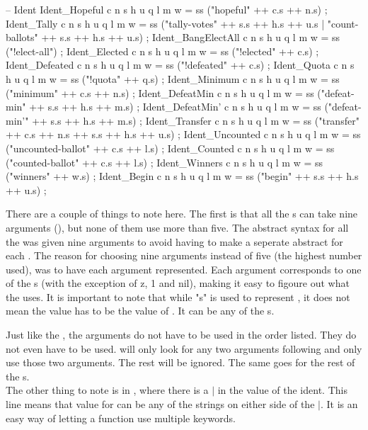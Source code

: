 \begin{lstgf}
        -- Ident
        Ident_Hopeful c n s h u q l m w
            = ss ("hopeful" ++ c.s ++ n.s) ;
        Ident_Tally c n s h u q l m w
            = ss ("tally-votes" ++ s.s ++ h.s ++ u.s | "count-ballots" ++ s.s ++ h.s ++ u.s) ;
        Ident_BangElectAll c n s h u q l m w
            = ss ("!elect-all") ;
        Ident_Elected c n s h u q l m w
            = ss ("!elected" ++ c.s) ;
        Ident_Defeated c n s h u q l m w
            = ss ("!defeated" ++ c.s) ;
        Ident_Quota c n s h u q l m w
            = ss ("!quota" ++ q.s) ;
        Ident_Minimum c n s h u q l m w
            = ss ("minimum" ++ c.s ++ n.s) ;
        Ident_DefeatMin c n s h u q l m w
            = ss ("defeat-min" ++ s.s ++ h.s ++ m.s) ;
        Ident_DefeatMin' c n s h u q l m w
            = ss ("defeat-min'" ++ s.s ++ h.s ++ m.s) ;
        Ident_Transfer c n s h u q l m w
            = ss ("transfer" ++ c.s ++ n.s ++ s.s ++ h.s ++ u.s) ;
        Ident_Uncounted c n s h u q l m w
            = ss ("uncounted-ballot" ++ c.s ++ l.s) ;
        Ident_Counted c n s h u q l m w
            = ss ("counted-ballot" ++ c.s ++ l.s) ;
        Ident_Winners c n s h u q l m w
            = ss ("winners" ++ w.s) ;
        Ident_Begin c n s h u q l m w
            = ss ("begin" ++ s.s ++ h.s ++ u.s) ;
\end{lstgf}
There are a couple of things to note here. The first is that all the s can take nine arguments (), but none of them use more than five. The abstract syntax for all the  was given nine arguments to avoid having to make a seperate abstract for each . The reason for choosing nine arguments instead of five (the highest number used), was to have each argument represented. Each argument corresponds to one of the s (with the exception of z, 1 and nil), making it easy to figoure out what the  uses. It is important to note that while "s" is used to represent , it does not mean the value has to be the value of . It can be any of the s. 

Just like the , the arguments do not have to be used in the order listed. They do not even have to be used.  will only look for any two arguments following and only use those two arguments. The rest will be ignored. The same goes for the rest of the s. \\
The other thing to note is in , where there is a $|$ in the value of the ident. This line means that value for  can be any of the strings on either side of the $|$. It is an easy way of letting a function use multiple keywords.

